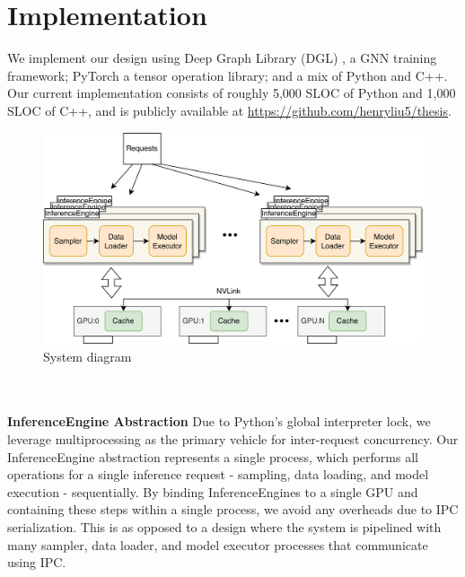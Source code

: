 \chapter{Implementation}
We implement our design using Deep Graph Library (DGL) \cite{DGL_2019}, a GNN training framework; PyTorch \cite{PyTorch_2019} a tensor operation library; and a mix of Python and C++.
Our current implementation consists of roughly 5,000 SLOC of Python and 1,000 SLOC of C++, and is publicly available at \url{https://github.com/henryliu5/thesis}.
\begin{figure}[h!]
    \centering
    \includegraphics[width=\textwidth]{diagrams/group_meeting_gnn-System Diagram.png}
    
    \caption{System diagram}
    \label{Our system diagram}
\end{figure} 
\\ \\
\noindent \textbf{InferenceEngine Abstraction} \quad Due to Python's global interpreter lock, we leverage multiprocessing as the primary vehicle for inter-request concurrency. Our InferenceEngine abstraction represents a single process, which performs all operations for a single inference request - sampling, data loading, and model execution - sequentially. By binding InferenceEngines to a single GPU and containing these steps within a single process, we avoid any overheads due to IPC serialization. This is as opposed to a design where the system is pipelined with many sampler, data loader, and model executor processes that communicate using IPC. 

